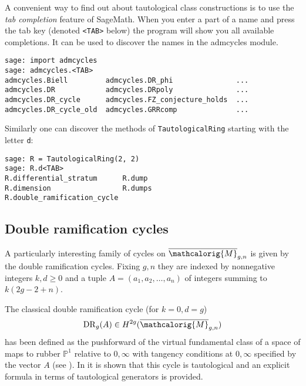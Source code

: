 \documentclass[11pt]{article}
\newcommand{\M}{\ensuremath{\overline{\mathcalorig{M}}}}
\newcommand{\DR}{\mathrm{DR}}
\begin{document}
A convenient way to find out about tautological class constructions is to use the \emph{tab completion} feature of SageMath. When you enter a part of a name and press the tab key (denoted \verb|<TAB>|  below) the program will show you all available completions. It can be used to discover the names in the admcycles module.
\begin{lstlisting}
sage: import admcycles
sage: admcycles.<TAB>
admcycles.Biell         admcycles.DR_phi               ...
admcycles.DR            admcycles.DRpoly               ...
admcycles.DR_cycle      admcycles.FZ_conjecture_holds  ...
admcycles.DR_cycle_old  admcycles.GRRcomp              ...
\end{lstlisting}
Similarly one can discover the methods of \verb|TautologicalRing| starting with the letter \texttt{d}:
\begin{lstlisting}
sage: R = TautologicalRing(2, 2)
sage: R.d<TAB>
R.differential_stratum      R.dump
R.dimension                 R.dumps
R.double_ramification_cycle
\end{lstlisting}


\subsection{Double ramification cycles} \label{Sect:DR}
A particularly interesting family of cycles on $\M_{g,n}$ is given by the double ramification cycles. Fixing $g,n$ they are indexed by nonnegative integers $k,d \geq 0$ and a tuple $A=(a_1,a_2, \ldots, a_n)$ of integers summing to $k(2g-2+n)$.

The classical double ramification cycle (for $k=0,d=g$)
\[\DR_g(A) \in H^{2g}(\M_{g,n})\]
has been defined as the pushforward of the virtual fundamental class of a space of maps to rubber $\mathbb{P}^1$ relative to $0, \infty$ with tangency conditions at $0, \infty$ specified by the vector $A$ (see \cite{liruan, Li2002A-degeneration-, Li2001Stable-morphism,Graber2005Relative-virtua}). In \cite{Janda2016Double-ramifica} it is shown  that this cycle is tautological and an explicit formula in terms of tautological generators is provided.
\end{document}
